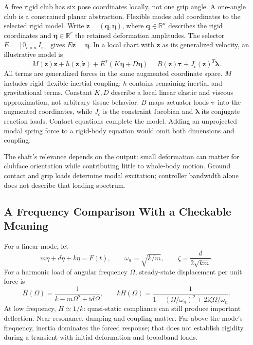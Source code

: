 A free rigid club has six pose coordinates locally, not one grip angle.
A one-angle club is a constrained planar abstraction. Flexible modes add
coordinates to the selected rigid model. Write $\bm z=(\bm q,\bm\eta)$,
where $\bm q\in\mathbb R^n$ describes the rigid coordinates and
$\bm\eta\in\mathbb R^r$ the retained deformation amplitudes.
The selector $E=[0_{r\times n}\ I_r]$ gives $E\bm z=\bm\eta$.
In a local chart with $\dot{\bm z}$ as
its generalized velocity, an illustrative model is
\begin{equation}
 M(\bm z)\ddot{\bm z}+h(\bm z,\dot{\bm z})
 +E^T(K\bm\eta+D\dot{\bm\eta})
 =B(\bm z)\bm\tau+J_c(\bm z)^T\bm\lambda .
 \label{eq:ch1:flexible-eom}
\end{equation}
All terms are generalized forces in the same augmented coordinate space.
$M$ includes rigid--flexible inertial coupling; $h$ contains remaining
inertial and gravitational terms. Constant $K,D$ describe a local linear
elastic and viscous approximation, not arbitrary tissue behavior.
$B$ maps actuator loads $\bm\tau$ into the augmented coordinates, while
$J_c$ is the constraint Jacobian and $\bm\lambda$ its conjugate reaction
loads. Contact equations complete the model. Adding an unprojected modal spring force
to a rigid-body equation would omit both dimensions and coupling.

The shaft's relevance depends on the output: small deformation can matter
for clubface orientation while contributing little to whole-body motion.
Ground contact and grip loads determine modal excitation; controller
bandwidth alone does not describe that loading spectrum.

\subsection{A Frequency Comparison With a Checkable Meaning}

For a linear mode, let
\[
 m\ddot\eta+d\dot\eta+k\eta=F(t),\qquad
 \omega_n=\sqrt{k/m},\qquad\zeta=\frac{d}{2\sqrt{km}}.
\]
For a harmonic load of angular frequency $\Omega$, steady-state displacement
per unit force is
\[
 H(\Omega)=\frac{1}{k-m\Omega^2+\mathrm i d\Omega},\qquad
 kH(\Omega)=\frac{1}{1-(\Omega/\omega_n)^2+2\mathrm i\zeta\Omega/\omega_n}.
\]
At low frequency, $H\simeq1/k$: quasi-static compliance can still produce
important deflection. Near resonance, damping and coupling matter. Far above
the mode's frequency, inertia dominates the forced response; that does not
establish rigidity during a transient with initial deformation and broadband
loads.

